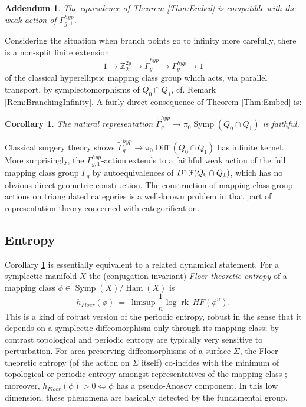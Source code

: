 \documentclass[reqno,10pt]{amsart}
\numberwithin{equation}{section}
\newcommand{\bZ}{{\mathbb Z}}
\newcommand{\scrF}{\EuScript{F}}
\newcommand{\rk}{\operatorname{rk}}
\newcommand{\Symp}{\operatorname{Symp}}
\newcommand{\Diff}{\operatorname{Diff}}
\newcommand{\Ham}{\operatorname{Ham}}
\newtheorem{Corollary}[thm]{Corollary}
\newtheorem{Addendum}[thm]{Addendum}
\theoremstyle{remark}
\begin{document}
\begin{Addendum} \label{Thm:Action}
 The equivalence of Theorem \ref{Thm:Embed} is compatible with the weak action of $\Gamma_{g,1}^{hyp}$. 
 \end{Addendum}
 
 Considering the situation when branch points go to infinity more carefully, there is a non-split finite extension
\[
1 \rightarrow \bZ_2^{2g} \longrightarrow \tilde{\Gamma}^{hyp}_g \longrightarrow \Gamma^{hyp}_g \rightarrow 1
\]
of the classical hyperelliptic mapping class group which acts, via parallel transport, by symplectomorphisms of $Q_0 \cap Q_1$, cf. Remark \ref{Rem:BranchingInfinity}.  A fairly direct consequence of Theorem \ref{Thm:Embed} is:

\begin{Corollary} \label{Cor:Faithful2}
The natural representation $\tilde{\Gamma}^{hyp}_g \rightarrow \pi_0\Symp(Q_0 \cap Q_1)$ is faithful.
\end{Corollary}

Classical surgery theory \cite[Theorem 13.5]{Sullivan} shows  $\tilde\Gamma_g^{hyp} \rightarrow \pi_0\Diff(Q_0 \cap Q_1)$ has infinite kernel.   More surprisingly, the $\Gamma_{g,1}^{hyp}$-action extends to a faithful weak action of the full mapping class group $\Gamma_g$ by autoequivalences of $D^{\pi}\scrF(Q_0\cap Q_1)$, which has no obvious direct geometric construction.  The construction of mapping class group actions on triangulated categories is a well-known problem in that part of representation theory concerned with categorification.

\subsection{Entropy}

Corollary \ref{Cor:Faithful2} is essentially equivalent to a related dynamical statement. For a symplectic manifold $X$  the (conjugation-invariant) \emph{Floer-theoretic entropy} of  a mapping class $\phi \in \Symp(X)/\Ham(X)$ is
\[ 
h_{Floer}(\phi) \ = \ \limsup \frac{1}{n} \log \rk\, HF(\phi^n).
\]
This is a kind of robust version of the periodic entropy, robust in the sense that it depends on a symplectic diffeomorphism only through its mapping class; by contrast topological and periodic entropy are typically very sensitive to perturbation.  
For area-preserving diffeomorphisms of a surface $\Sigma$, the Floer-theoretic entropy (of the action on $\Sigma$ itself) co-incides with the minimum of topological or periodic entropy amongst representatives of the mapping class  \cite{Cotton-Clay,FLP, Felshtyn}; moreover, $h_{Floer}(\phi)>0 \Leftrightarrow \phi$ has a pseudo-Anosov component.   In this low dimension, these phenomena are basically detected by the fundamental group. 
\end{document}
